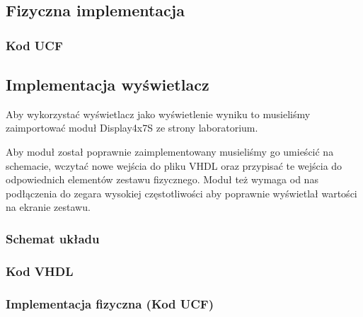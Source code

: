 \documentclass[a4paper,12pt]{extarticle}  %
\begin{document}
\subsection{Fizyczna implementacja}
\subsubsection{Kod UCF}

\subsection{Implementacja wyświetlacz}
Aby wykorzystać wyświetlacz jako wyświetlenie wyniku to musieliśmy zaimportować moduł Display4x7S ze strony laboratorium.

Aby moduł został poprawnie zaimplementowany musieliśmy go umieścić na schemacie, wczytać nowe wejścia do pliku VHDL oraz przypisać te wejścia do odpowiednich elementów zestawu fizycznego.
Moduł też wymaga od nas podłączenia do zegara wysokiej częstotliwości aby poprawnie wyświetlał wartości na ekranie zestawu.
\subsubsection{Schemat układu}
\begin{figure}[H]
	\centering
\end{figure}
\subsubsection{Kod VHDL}

\subsubsection{Implementacja fizyczna (Kod UCF)}

\end{document}
